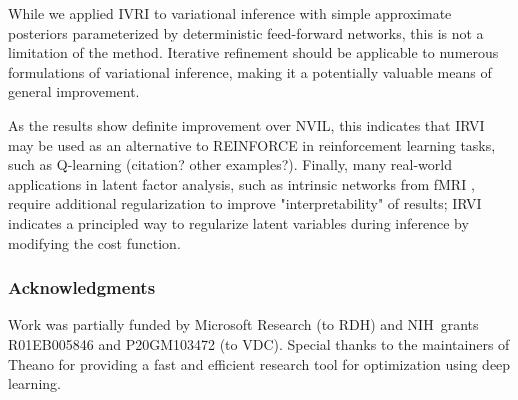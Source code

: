 \documentclass{article} %
\begin{document}
While we applied IVRI to variational inference with simple approximate posteriors parameterized by deterministic feed-forward networks, this is not a limitation of the method. Iterative refinement should be applicable to numerous formulations of variational inference, making it a potentially valuable means of general improvement.

As the results show definite improvement over NVIL, this indicates that IRVI may be used as an alternative to REINFORCE in reinforcement learning tasks, such as Q-learning (citation? other examples?). Finally, many real-world applications in latent factor analysis, such as intrinsic networks from fMRI \citep{hjelm2014restricted}, require additional regularization to improve "interpretability" of results; IRVI indicates a principled way to regularize latent variables during inference by modifying the cost function.

\subsubsection*{Acknowledgments}
Work was partially funded by Microsoft Research (to RDH) and NIH\ grants R01EB005846 and P20GM103472 (to VDC). Special thanks to the maintainers of Theano for providing a fast and efficient research tool for optimization using deep learning.



\end{document}
